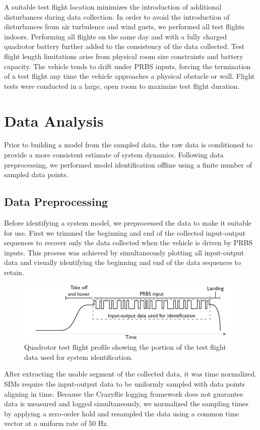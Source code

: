 A suitable test flight location minimizes the introduction of additional disturbances during data collection. In order to avoid the introduction of disturbances from air turbulence and wind gusts, we performed all test flights indoors. Performing all flights on the same day and with a fully charged quadrotor battery further added to the consistency of the data collected. Test flight length limitations arise from physical room size constraints and battery capacity. The vehicle tends to drift under PRBS inputs, forcing the termination of a test flight any time the vehicle approaches a physical obstacle or wall. Flight tests were conducted in a large, open room to maximize test flight duration. 

\section{Data Analysis}
Prior to building a model from the sampled data, the raw data is conditioned to provide a more consistent estimate of system dynamics. Following data preprocessing, we performed model identification offline using a finite number of sampled data points.


\subsection{Data Preprocessing}
Before identifying a system model, we preprocessed the data to make it suitable for use. First we trimmed the beginning and end of the collected input-output sequences to recover only the data collected when the vehicle is driven by PRBS inputs. This process was achieved by simultaneously plotting all input-output data and visually identifying the beginning and end of the data sequences to retain.
\begin{figure}[htb!]
	\centering
	\includegraphics{../fig/test_flight_profile.pdf}
	\caption{Quadrotor test flight profile showing the portion of the test flight data used for system identification.}
	\label{fig:test_flight_profile}
\end{figure}

After extracting the usable segment of the collected data, it was time normalized. SIMs require the input-output data to be uniformly sampled with data points aligning in time. Because the Crazyflie logging framework does not guarantee data is measured and logged simultaneously, we normalized the sampling times by applying a zero-order hold and resampled the data using a common time vector at a uniform rate of 50 Hz.


